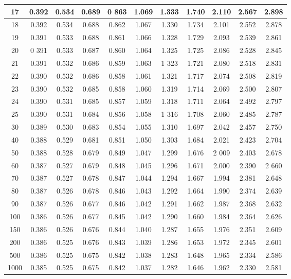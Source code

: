 \documentclass[11pt,a4paper]{article}
\begin{document}
\begin{table}[h]
\begin{tabular}{|c||c|c|c|c|c|c|c|c|c|c|}
		\hline
		17	& 0.392	& 0.534	& 0.689	& 0
		863	& 1.069	& 1.333	& 1.740	& 2.110	& 2.567	& 2.898\\
		\hline
		18	& 0.392	& 0.534	& 0.688	& 0.862	& 1.067	& 1.330	& 1.734	& 2.101	& 2.552	& 2.878\\
		\hline
		19	& 0.391	& 0.533	& 0.688	& 0.861	& 1.066	& 1.328	& 1.729	& 2.093	& 2.539	& 2.861\\
		\hline
		20	& 0
		391	& 0.533	& 0.687	& 0.860	& 1.064	& 1.325	& 1.725	& 2.086	& 2.528	& 2.845\\
		\hline
		21	& 0.391	& 0.532	& 0.686	& 0.859	& 1.063	& 1
		323	& 1.721	& 2.080	& 2.518	& 2.831\\
		\hline
		22	& 0.390	& 0.532	& 0.686	& 0.858	& 1.061	& 1.321	& 1.717	& 2.074	& 2.508	& 2.819\\
		\hline
		23	& 0.390	& 0.532	& 0.685	& 0.858	& 1.060	& 1.319	& 1.714	& 2.069	& 2.500	& 2.807\\
		\hline
		24	& 0.390	& 0.531	& 0.685	& 0.857	& 1.059	& 1.318	& 1.711	& 2.064	& 2.492	& 2.797\\
		\hline
		25	& 0.390	& 0.531	& 0.684	& 0.856	& 1.058	& 1
		316	& 1.708	& 2.060	& 2.485	& 2.787\\
		\hline
		30	& 0.389	& 0.530	& 0.683	& 0.854	& 1.055	& 1.310	& 1.697	& 2.042	& 2.457	& 2.750\\
		\hline
		40	& 0.388	& 0.529	& 0.681	& 0.851	& 1.050	& 1.303	& 1.684	& 2.021	& 2.423	& 2.704\\
		\hline
		50	& 0.388	& 0.528	& 0.679	& 0.849	& 1.047	& 1.299	& 1.676	& 2
		009	& 2.403	& 2.678\\
		\hline
		60	& 0.387	& 0.527	& 0.679	& 0.848	& 1.045	& 1.296	& 1.671	& 2.000	& 2.390	& 2
		660\\
		\hline
		70	& 0.387	& 0.527	& 0.678	& 0.847	& 1.044	& 1.294	& 1.667	& 1.994	& 2.381	& 2.648\\
		\hline
		80	& 0.387	& 0.526	& 0.678	& 0.846	& 1.043	& 1.292	& 1.664	& 1.990	& 2.374	& 2.639\\
		\hline
		90	& 0.387	& 0.526	& 0.677	& 0.846	& 1.042	& 1.291	& 1.662	& 1.987	& 2.368	& 2.632\\
		\hline
		100	& 0.386	& 0.526	& 0.677	& 0.845	& 1.042	& 1.290	& 1.660	& 1.984	& 2.364	& 2.626\\
		\hline
		150	& 0.386	& 0.526	& 0.676	& 0.844	& 1.040	& 1.287	& 1.655	& 1.976	& 2.351	& 2.609\\
		\hline
		200	& 0.386	& 0.525	& 0.676	& 0.843	& 1.039	& 1.286	& 1.653	& 1.972	& 2.345	& 2.601\\
		\hline
		500	& 0.386	& 0.525	& 0.675	& 0.842	& 1.038	& 1.283	& 1.648	& 1.965	& 2.334	& 2.586\\
		\hline
		1000	& 0.385	& 0.525	& 0.675	& 0.842	& 1.037	& 1.282	& 1.646	& 1.962	& 2.330	& 2.581\\
		\hline
	\end{tabular}
\end{table}
\end{document}
